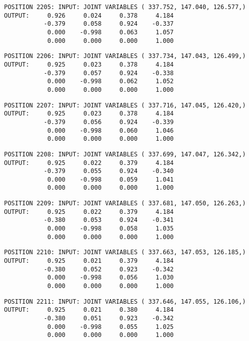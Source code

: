 \begin{verbatim}
POSITION 2205: INPUT: JOINT VARIABLES ( 337.752, 147.040, 126.577,)
OUTPUT:     0.926     0.024     0.378     4.184
           -0.379     0.058     0.924    -0.337
            0.000    -0.998     0.063     1.057
            0.000     0.000     0.000     1.000
\end{verbatim} \pagebreak[1]\begin{verbatim}
POSITION 2206: INPUT: JOINT VARIABLES ( 337.734, 147.043, 126.499,)
OUTPUT:     0.925     0.023     0.378     4.184
           -0.379     0.057     0.924    -0.338
            0.000    -0.998     0.062     1.052
            0.000     0.000     0.000     1.000
\end{verbatim} \pagebreak[1]\begin{verbatim}
POSITION 2207: INPUT: JOINT VARIABLES ( 337.716, 147.045, 126.420,)
OUTPUT:     0.925     0.023     0.378     4.184
           -0.379     0.056     0.924    -0.339
            0.000    -0.998     0.060     1.046
            0.000     0.000     0.000     1.000
\end{verbatim} \pagebreak[1]\begin{verbatim}
POSITION 2208: INPUT: JOINT VARIABLES ( 337.699, 147.047, 126.342,)
OUTPUT:     0.925     0.022     0.379     4.184
           -0.379     0.055     0.924    -0.340
            0.000    -0.998     0.059     1.041
            0.000     0.000     0.000     1.000
\end{verbatim} \pagebreak[1]\begin{verbatim}
POSITION 2209: INPUT: JOINT VARIABLES ( 337.681, 147.050, 126.263,)
OUTPUT:     0.925     0.022     0.379     4.184
           -0.380     0.053     0.924    -0.341
            0.000    -0.998     0.058     1.035
            0.000     0.000     0.000     1.000
\end{verbatim} \pagebreak[1]\begin{verbatim}
POSITION 2210: INPUT: JOINT VARIABLES ( 337.663, 147.053, 126.185,)
OUTPUT:     0.925     0.021     0.379     4.184
           -0.380     0.052     0.923    -0.342
            0.000    -0.998     0.056     1.030
            0.000     0.000     0.000     1.000
\end{verbatim} \pagebreak[1]\begin{verbatim}
POSITION 2211: INPUT: JOINT VARIABLES ( 337.646, 147.055, 126.106,)
OUTPUT:     0.925     0.021     0.380     4.184
           -0.380     0.051     0.923    -0.342
            0.000    -0.998     0.055     1.025
            0.000     0.000     0.000     1.000
\end{verbatim} \pagebreak[1]\begin{verbatim}

\end{verbatim}
